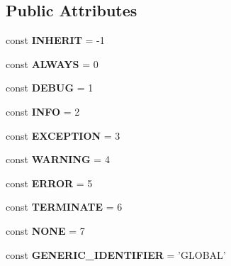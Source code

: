 \subsection*{Public Attributes}
\begin{DoxyCompactItemize}
\item 
\hypertarget{class_logger_a7d7bfc072f31d89d47f0b66159d5e385}{const {\bfseries I\-N\-H\-E\-R\-I\-T} = -\/1}\label{class_logger_a7d7bfc072f31d89d47f0b66159d5e385}

\item 
\hypertarget{class_logger_add9d10860e1347360209a2f2b4a90a9a}{const {\bfseries A\-L\-W\-A\-Y\-S} = 0}\label{class_logger_add9d10860e1347360209a2f2b4a90a9a}

\item 
\hypertarget{class_logger_a7c7cc48e943eaf5fdfac82539bdb7ea7}{const {\bfseries D\-E\-B\-U\-G} = 1}\label{class_logger_a7c7cc48e943eaf5fdfac82539bdb7ea7}

\item 
\hypertarget{class_logger_a3b8292b16f7a7c154f9a8fba73be77bb}{const {\bfseries I\-N\-F\-O} = 2}\label{class_logger_a3b8292b16f7a7c154f9a8fba73be77bb}

\item 
\hypertarget{class_logger_a2b8319ace5692281cc34a1b5d6dcc771}{const {\bfseries E\-X\-C\-E\-P\-T\-I\-O\-N} = 3}\label{class_logger_a2b8319ace5692281cc34a1b5d6dcc771}

\item 
\hypertarget{class_logger_ad3aeb7e34220e61e1b00a84db7655c30}{const {\bfseries W\-A\-R\-N\-I\-N\-G} = 4}\label{class_logger_ad3aeb7e34220e61e1b00a84db7655c30}

\item 
\hypertarget{class_logger_aa34a753ba42f06c914708eca2098e235}{const {\bfseries E\-R\-R\-O\-R} = 5}\label{class_logger_aa34a753ba42f06c914708eca2098e235}

\item 
\hypertarget{class_logger_a338704427ea36e3d8499d65aa09b951e}{const {\bfseries T\-E\-R\-M\-I\-N\-A\-T\-E} = 6}\label{class_logger_a338704427ea36e3d8499d65aa09b951e}

\item 
\hypertarget{class_logger_a6700e6d77288e3695320b4078e304b6f}{const {\bfseries N\-O\-N\-E} = 7}\label{class_logger_a6700e6d77288e3695320b4078e304b6f}

\item 
\hypertarget{class_logger_ace35692bcef5bca786f7ad6111bf0d0d}{const {\bfseries G\-E\-N\-E\-R\-I\-C\-\_\-\-I\-D\-E\-N\-T\-I\-F\-I\-E\-R} = 'G\-L\-O\-B\-A\-L'}\label{class_logger_ace35692bcef5bca786f7ad6111bf0d0d}

\end{DoxyCompactItemize}


